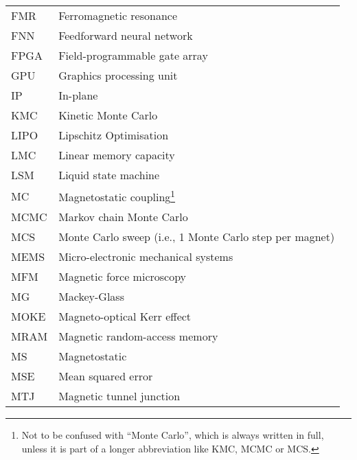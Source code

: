{\begin{longtable}[l]{ll}
        FMR   & Ferromagnetic resonance                     \\
        FNN   & Feedforward neural network                  \\
        FPGA  & Field-programmable gate array               \\
        GPU   & Graphics processing unit                    \\
        IP    & In-plane                                    \\
        KMC   & Kinetic Monte Carlo                         \\
        LIPO  & Lipschitz Optimisation                      \\
        LMC   & Linear memory capacity                      \\
        LSM   & Liquid state machine                        \\
        MC    & Magnetostatic coupling\footnote{Not to be confused with ``Monte Carlo'', which is always written in full, unless it is part of a longer abbreviation like KMC, MCMC or MCS.} \\
        MCMC  & Markov chain Monte Carlo                    \\
        MCS   & Monte Carlo sweep (i.e., 1 Monte Carlo step per magnet) \\
        MEMS  & Micro-electronic mechanical systems         \\
        MFM   & Magnetic force microscopy                   \\
        MG    & Mackey-Glass                                \\
        MOKE  & Magneto-optical Kerr effect                 \\
        MRAM  & Magnetic random-access memory               \\
        MS    & Magnetostatic                               \\
        MSE   & Mean squared error                          \\
        MTJ   & Magnetic tunnel junction                    \\

\end{longtable}}
